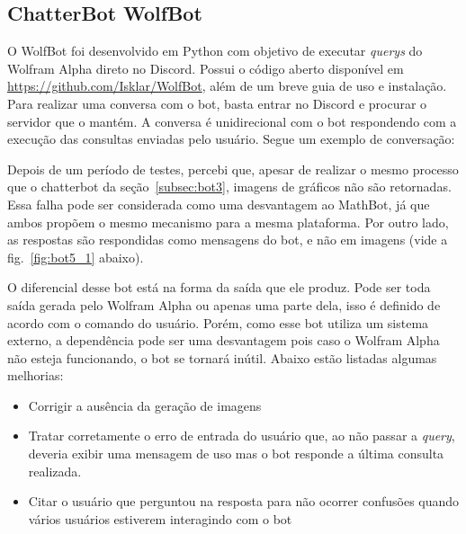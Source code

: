 \subsection{ChatterBot WolfBot}\label{subsec:bot5}

O WolfBot foi desenvolvido em Python com objetivo de executar \emph{querys} do Wolfram Alpha direto no Discord.
Possui o código aberto disponível em \url{https://github.com/Isklar/WolfBot}, além de um breve guia de uso e instalação.
Para realizar uma conversa com o bot, basta entrar no Discord e procurar o servidor que o mantém.
A conversa é unidirecional com o bot respondendo com a execução das consultas enviadas pelo usuário.
Segue um exemplo de conversação:


Depois de um período de testes, percebi que, apesar de realizar o mesmo processo que o chatterbot da seção~\ref{subsec:bot3}, imagens de gráficos não são retornadas. Essa falha pode ser considerada como uma desvantagem ao MathBot, já que ambos propõem o mesmo mecanismo para a mesma plataforma. Por outro lado, as respostas são respondidas como mensagens do bot, e não em imagens (vide a fig.~\ref{fig:bot5_1} abaixo).


O diferencial desse bot está na forma da saída que ele produz. Pode ser toda saída gerada pelo Wolfram Alpha ou apenas uma parte dela, isso é definido de acordo com o comando do usuário. Porém, como esse bot utiliza um sistema externo, a dependência pode ser uma desvantagem pois caso o Wolfram Alpha não esteja funcionando, o bot se tornará inútil.
Abaixo estão listadas algumas melhorias:
\begin{itemize}[noitemsep]
    \item Corrigir a ausência da geração de imagens
    \item Tratar corretamente o erro de entrada do usuário que, ao não passar a \emph{query}, deveria exibir uma mensagem de uso mas o bot responde a última consulta realizada.
    \item Citar o usuário que perguntou na resposta para não ocorrer confusões quando vários usuários estiverem interagindo com o bot
\end{itemize}